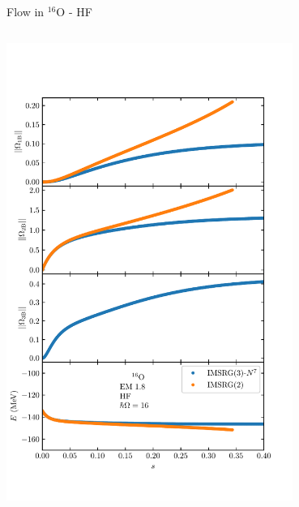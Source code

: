 \documentclass[aspectratio=169]{beamer}
\begin{document}
\begin{frame}{Flow in ${}^{16}\text{O}$ - HF}
\begin{columns}
\begin{column}{0.5\textwidth}
\begin{center}
        \includegraphics[trim=0 1.0cm 0 1.5cm, clip, width=0.7\textwidth]{thesis/talk/images/oxygen_flow_imsrg2_and_3_omega.pdf}
      \end{center}
    \end{column}

  \end{columns}
\end{frame}
\end{document}
